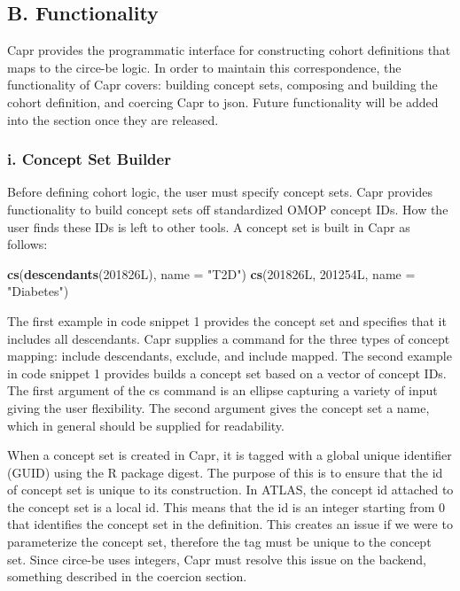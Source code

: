 \documentclass[
]{article}
\newenvironment{Shaded}{\begin{snugshade}}{\end{snugshade}}
\newcommand{\AttributeTok}[1]{\textcolor[rgb]{0.13,0.29,0.53}{#1}}
\newcommand{\DataTypeTok}[1]{\textcolor[rgb]{0.13,0.29,0.53}{#1}}
\newcommand{\DecValTok}[1]{\textcolor[rgb]{0.00,0.00,0.81}{#1}}
\newcommand{\FunctionTok}[1]{\textcolor[rgb]{0.13,0.29,0.53}{\textbf{#1}}}
\newcommand{\NormalTok}[1]{#1}
\newcommand{\StringTok}[1]{\textcolor[rgb]{0.31,0.60,0.02}{#1}}
\begin{document}
\subsection{B. Functionality}\label{b.-functionality}

Capr provides the programmatic interface for constructing cohort
definitions that maps to the circe-be logic. In order to maintain this
correspondence, the functionality of Capr covers: building concept sets,
composing and building the cohort definition, and coercing Capr to json.
Future functionality will be added into the section once they are
released.

\subsubsection{i. Concept Set Builder}\label{i.-concept-set-builder}

Before defining cohort logic, the user must specify concept sets. Capr
provides functionality to build concept sets off standardized OMOP
concept IDs. How the user finds these IDs is left to other tools. A
concept set is built in Capr as follows:

\begin{Shaded}
\begin{Highlighting}[]
\FunctionTok{cs}\NormalTok{(}\FunctionTok{descendants}\NormalTok{(}\DecValTok{201826}\DataTypeTok{L}\NormalTok{), }\AttributeTok{name =} \StringTok{"T2D"}\NormalTok{)}
\FunctionTok{cs}\NormalTok{(}\DecValTok{201826}\DataTypeTok{L}\NormalTok{, }\DecValTok{201254}\DataTypeTok{L}\NormalTok{, }\AttributeTok{name =} \StringTok{"Diabetes"}\NormalTok{)}
\end{Highlighting}
\end{Shaded}

The first example in code snippet 1 provides the concept set and
specifies that it includes all descendants. Capr supplies a command for
the three types of concept mapping: include descendants, exclude, and
include mapped. The second example in code snippet 1 provides builds a
concept set based on a vector of concept IDs. The first argument of the
cs command is an ellipse capturing a variety of input giving the user
flexibility. The second argument gives the concept set a name, which in
general should be supplied for readability.

When a concept set is created in Capr, it is tagged with a global unique
identifier (GUID) using the R package digest. The purpose of this is to
ensure that the id of concept set is unique to its construction. In
ATLAS, the concept id attached to the concept set is a local id. This
means that the id is an integer starting from 0 that identifies the
concept set in the definition. This creates an issue if we were to
parameterize the concept set, therefore the tag must be unique to the
concept set. Since circe-be uses integers, Capr must resolve this issue
on the backend, something described in the coercion section.
\end{document}
